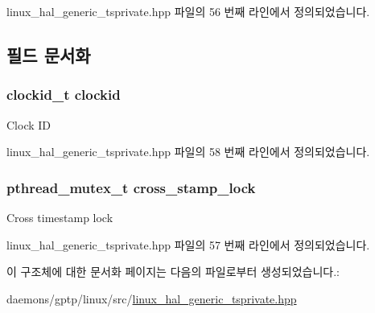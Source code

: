 linux\+\_\+hal\+\_\+generic\+\_\+tsprivate.\+hpp 파일의 56 번째 라인에서 정의되었습니다.



\subsection{필드 문서화}
\subsubsection[{\texorpdfstring{clockid}{clockid}}]{\setlength{\rightskip}{0pt plus 5cm}clockid\+\_\+t clockid}\hypertarget{struct_linux_timestamper_generic_private_a4f74a0f0dc6605cf35e80f22e678c831}{}\label{struct_linux_timestamper_generic_private_a4f74a0f0dc6605cf35e80f22e678c831}
Clock ID 

linux\+\_\+hal\+\_\+generic\+\_\+tsprivate.\+hpp 파일의 58 번째 라인에서 정의되었습니다.

\subsubsection[{\texorpdfstring{cross\+\_\+stamp\+\_\+lock}{cross_stamp_lock}}]{\setlength{\rightskip}{0pt plus 5cm}pthread\+\_\+mutex\+\_\+t cross\+\_\+stamp\+\_\+lock}\hypertarget{struct_linux_timestamper_generic_private_ae5cec0e25da0e952533ca2644d0040d0}{}\label{struct_linux_timestamper_generic_private_ae5cec0e25da0e952533ca2644d0040d0}
Cross timestamp lock 

linux\+\_\+hal\+\_\+generic\+\_\+tsprivate.\+hpp 파일의 57 번째 라인에서 정의되었습니다.



이 구조체에 대한 문서화 페이지는 다음의 파일로부터 생성되었습니다.\+:\begin{DoxyCompactItemize}
\item 
daemons/gptp/linux/src/\hyperlink{linux__hal__generic__tsprivate_8hpp}{linux\+\_\+hal\+\_\+generic\+\_\+tsprivate.\+hpp}\end{DoxyCompactItemize}

